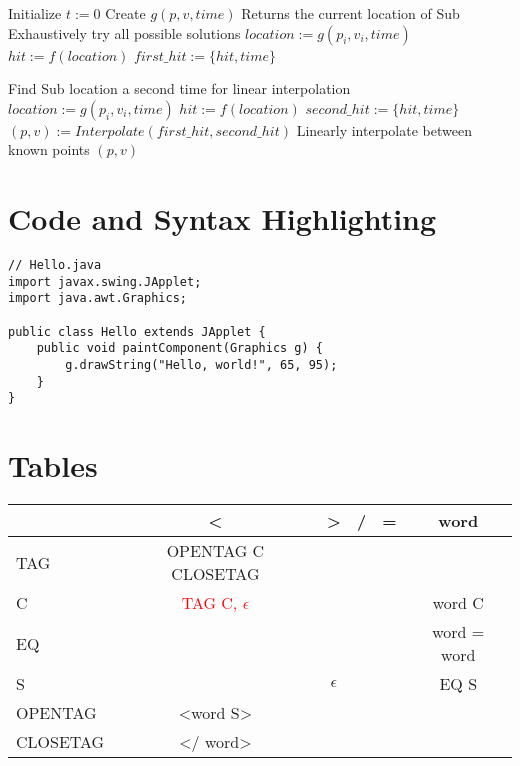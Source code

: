 \documentclass[11pt]{article}
\begin{document}
\begin{algorithmic}[1]
\State Initialize $t:=0$
\State Create $g(p,v,time)$
\Comment Returns the current location of Sub 
\Comment  Exhaustively try all possible solutions
\State $location := g(p_i,v_i,time)$
\State $hit := f(location)$
 $first\_hit := \{hit, time\}$
\EndIf
\EndFor

\Comment  Find Sub location a second time for linear interpolation
\State $location := g(p_i,v_i,time)$
\State $hit := f(location)$
 $second\_hit := \{hit, time\}$
\EndIf
\EndFor
\State $(p, v) := Interpolate(first\_hit, second\_hit)$
\Comment Linearly interpolate between known points
\Return $(p, v)$

\end{algorithmic}

\section{Code and Syntax Highlighting}

\lstset{language=Java}

\begin{lstlisting}
// Hello.java
import javax.swing.JApplet;
import java.awt.Graphics;

public class Hello extends JApplet {
    public void paintComponent(Graphics g) {
        g.drawString("Hello, world!", 65, 95);
    }    
}
\end{lstlisting}

\section{Tables}
\begin{center}
  \begin{tabular}{ l || c | c | c | c | c }
   & < & > & / & = & word \\
    \hline \hline
    TAG & OPENTAG C CLOSETAG &  & & \\ \hline
      C & \textcolor{red}{ TAG C, $\epsilon$} & & & & word C  \\ \hline
    EQ &  & & & & word = word \\ \hline
    S &  & $\epsilon$ & &  & EQ S\\ \hline
    OPENTAG & <word S> & & && \\ \hline
    CLOSETAG & </ word>  & &&&  \\ \hline
  
  \end{tabular}
\end{center}
\end{document}

